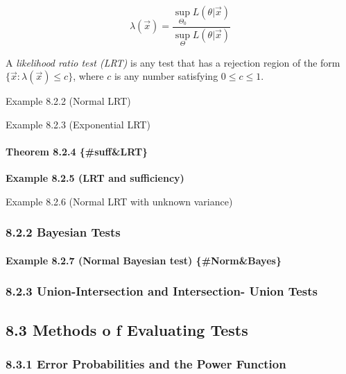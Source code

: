 \documentclass[6pt,Portrait]{article}
\let\oldparagraph\paragraph
\renewcommand{\paragraph}[1]{\oldparagraph{#1}\mbox{}}
\begin{document}
\[\lambda(\vec x)=\frac{\sup\limits_{\Theta_0} L(\theta|\vec x)}{\sup\limits_{\Theta} L(\theta|\vec x)}\]

A \emph{likelihood ratio test (LRT)} is any test that has a rejection
region of the form \(\{\vec x:\lambda(\vec x)\le c\}\), where \(c\) is
any number satisfying \(0\le c\le 1\).

Example 8.2.2 (Normal LRT)

Example 8.2.3 (Exponential LRT)

\hypertarget{theorem-8.2.4-sufflrt}{%
\paragraph{Theorem 8.2.4 \{\#suff\&LRT\}}\label{theorem-8.2.4-sufflrt}}

\textbf{Example 8.2.5 (LRT and sufficiency)}

Example 8.2.6 (Normal LRT with unknown variance)

\hypertarget{BayesT}{%
\subsubsection{8.2.2 Bayesian Tests}\label{BayesT}}

\hypertarget{example-8.2.7-normal-bayesian-test-normbayes}{%
\paragraph{\texorpdfstring{\textbf{Example 8.2.7 (Normal Bayesian test)}
\{\#Norm\&Bayes\}}{Example 8.2.7 (Normal Bayesian test) \{\#Norm\&Bayes\}}}\label{example-8.2.7-normal-bayesian-test-normbayes}}

\hypertarget{union-intersection-and-intersection--union-tests}{%
\subsubsection{8.2.3 Union-Intersection and Intersection- Union
Tests}\label{union-intersection-and-intersection--union-tests}}

\hypertarget{methods-o-f-evaluating-tests}{%
\subsection{8.3 Methods o f Evaluating
Tests}\label{methods-o-f-evaluating-tests}}

\hypertarget{error-probabilities-and-the-power-function}{%
\subsubsection{8.3.1 Error Probabilities and the Power
Function}\label{error-probabilities-and-the-power-function}}
\end{document}
